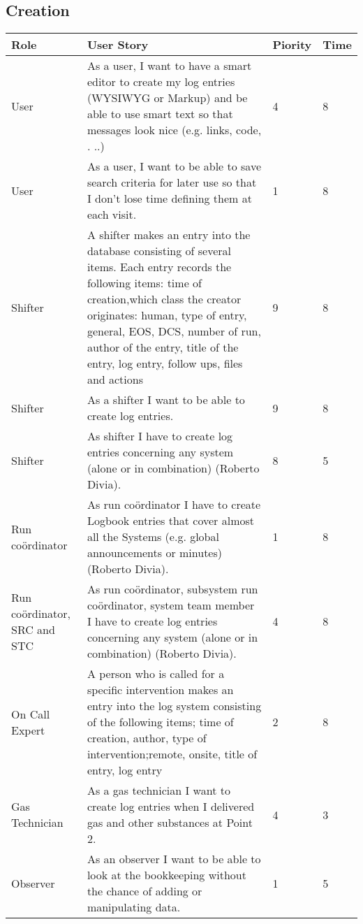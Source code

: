 \subsection{Creation}
\begin{longtable}{ | p{2cm} | p{8cm} | p{1.5cm} | l |}
\hline
Role & User Story & Piority & Time \\ \hline
User &  As a user, I want to have a smart editor to create my log entries
(WYSIWYG or Markup) and be able to use smart text so that messages look nice (e.g. links, code, . ..)& 4 & 8 \\ \hline
User &  As a user, I want to be able to save search criteria for later use so that I don’t lose time defining them at each visit. & 1 & 8 \\ \hline
Shifter &  A shifter makes an entry into the database consisting of several items. Each entry records the following items: time of creation,which class the creator originates: human, type of entry, general, EOS, DCS, number of run, author of the entry, title of the entry, log entry, follow ups, files and actions & 9 & 8 \\ \hline
Shifter &  As a shifter I want to be able to create log entries. & 9 & 8 \\ \hline
Shifter & As shifter I have to create log entries concerning any system (alone or in combination) (Roberto Divia). & 8 & 5 \\ \hline
Run coördinator & As run coördinator I have to create Logbook entries that cover almost all the Systems (e.g. global announcements or minutes) (Roberto Divia). & 1 & 8 \\ \hline
Run coördinator, SRC and STC & As run coördinator, subsystem run coördinator, system team member I have to create log entries concerning any system (alone or in combination) (Roberto Divia). & 4 & 8 \\ \hline
\newpage
\hline
On Call Expert & A person who is called for a specific intervention makes an entry into the log system consisting of the following items; time of creation, author, type of intervention;remote, onsite, title of entry, log entry & 2 & 8 \\ \hline
Gas Technician & As a gas technician I want to create log entries when I delivered gas
and other substances at Point 2. & 4 & 3 \\ \hline
Observer &  As an observer I want to be able to look at the bookkeeping without
the chance of adding or manipulating data. & 1 & 5 \\ \hline 
\end{longtable}

